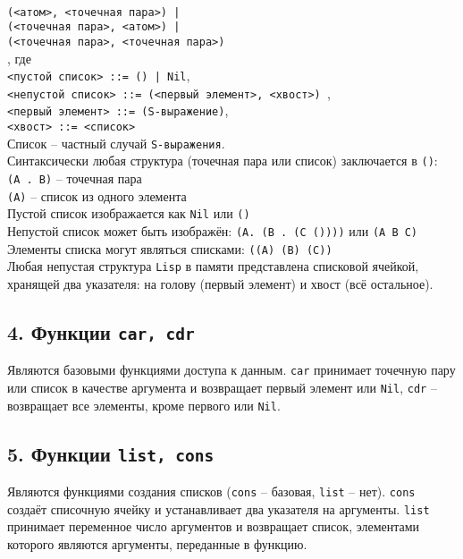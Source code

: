 \\
{\texttt{(<атом>, <точечная пара>) |}}\\
{\texttt{(<точечная пара>, <атом>) |}}\\
{\texttt{(<точечная пара>, <точечная пара>)}}\\
, где\\
{\texttt{<пустой список> ::= () | Nil}},\\
{\texttt{<непустой список> ::= (<первый элемент>, <хвост>) }},\\
{\texttt{<первый элемент> ::= (S-выражение)}},\\
{\texttt{<хвост> ::= <список>}}\\
\noindent Список -- частный случай {\texttt{S-выражения}}.\\
Синтаксически любая структура (точечная пара или список) заключается в {\texttt{()}}:\\
{\texttt{(A . B)}} -- точечная пара\\
{\texttt{(A)}} -- список из одного элемента\\
Пустой список изображается как {\texttt{Nil}} или {\texttt{()}}\\
Непустой список может быть изображён: {\texttt{(A. (B . (C ())))}} или {\texttt{(A B C)}}\\
Элементы списка могут являться списками: {\texttt{((A) (B) (C))}}\\

Любая непустая структура {\texttt{Lisp}} в памяти представлена списковой ячейкой, хранящей два указателя: на голову (первый элемент) и хвост (всё остальное).

\subsection*{4. Функции {\texttt{car, cdr}}}

Являются базовыми функциями доступа к данным. {\texttt{car}} принимает точечную пару или список в качестве аргумента и возвращает первый элемент или {\texttt{Nil}}, {\texttt{cdr}} -- возвращает все элементы, кроме первого или {\texttt{Nil}}.

\subsection*{5. Функции {\texttt{list, cons}}}

Являются функциями создания списков ({\texttt{cons}} -- базовая, {\texttt{list}} -- нет). {\texttt{cons}} создаёт списочную ячейку и устанавливает два указателя на аргументы. {\texttt{list}} принимает переменное число аргументов и возвращает список, элементами которого являются аргументы, переданные в функцию.